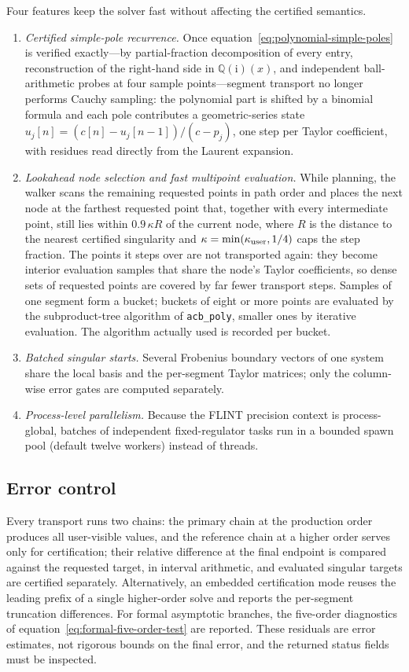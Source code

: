 \documentclass[11pt,a4paper]{article}
\newcommand{\ii}{\mathrm i}
\begin{document}
Four features keep the solver fast without affecting the certified semantics.
\begin{enumerate}
\item \emph{Certified simple-pole recurrence.} Once
equation~\eqref{eq:polynomial-simple-poles} is verified exactly---by partial-fraction
decomposition of every entry, reconstruction of the right-hand side in
$\mathbb Q(\ii)(x)$, and independent ball-arithmetic probes at four sample
points---segment transport no longer performs Cauchy sampling: the polynomial part is
shifted by a binomial formula and
each pole contributes a geometric-series state $u_j[n]=(c[n]-u_j[n-1])/(c-p_j)$, one step
per Taylor coefficient, with residues read directly from the Laurent expansion.
\item \emph{Lookahead node selection and fast multipoint evaluation.} While planning, the
walker scans the remaining requested points in path order and places the next node at the
farthest requested point that, together with every intermediate point, still lies within
$0.9\,\kappa R$ of the current node, where $R$ is the distance to the nearest certified
singularity and $\kappa=\min(\kappa_{\rm user},1/4)$ caps the step fraction. The points it
steps over are not transported again: they become interior evaluation samples that share
the node's Taylor coefficients, so dense sets of requested points are covered by far fewer
transport steps. Samples of one segment form a bucket; buckets of eight or more points are
evaluated by the subproduct-tree algorithm of \texttt{acb\_poly}, smaller ones by
iterative evaluation. The algorithm actually used is recorded per bucket.
\item \emph{Batched singular starts.} Several Frobenius boundary vectors of one system
share the local basis and the per-segment Taylor matrices; only the column-wise error
gates are computed separately.
\item \emph{Process-level parallelism.} Because the FLINT precision context is
process-global, batches of independent fixed-regulator tasks run in a bounded spawn pool
(default twelve workers) instead of threads.
\end{enumerate}

\subsection{Error control}
\label{sec:error-control}

Every transport runs two chains: the primary chain at the production order produces all
user-visible values, and the reference chain at a higher order serves only for
certification; their relative difference at the final endpoint is compared against the
requested target, in interval arithmetic, and evaluated singular targets are certified
separately. Alternatively, an embedded certification mode reuses the leading prefix of a
single higher-order solve and reports the per-segment truncation differences. For formal
asymptotic branches, the five-order diagnostics of
equation~\eqref{eq:formal-five-order-test} are reported. These residuals are error
estimates, not rigorous bounds on the final error, and the returned status fields must be
inspected.
\end{document}
